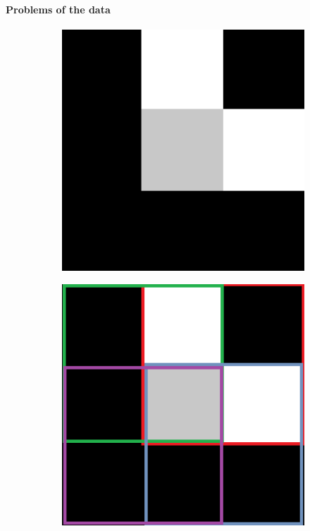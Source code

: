 \documentclass{article}
\begin{document}
\paragraph{Problems of the data}
\begin{figure}[H]
	\centering
	\begin{subfigure}[b]{0.36\textwidth}
		\includegraphics[width = \linewidth]{Lpoint.png}
		\caption{}
		\label{fig:lpoint}
	\end{subfigure}
	\hspace{\fill}
	\begin{subfigure}[b]{0.36\textwidth}
		\includegraphics[width = \linewidth]{Lpoint_mask.png}

\end{subfigure}
\end{figure}
\end{document}
